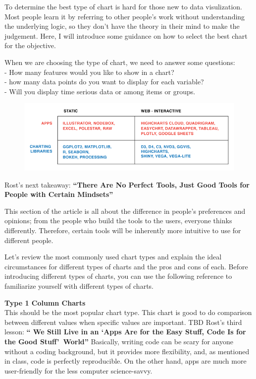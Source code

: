 \documentclass[]{book}
\theoremstyle{definition}
\theoremstyle{definition}
\theoremstyle{definition}
\theoremstyle{remark}
\begin{document}
To determine the best type of chart is hard for those new to data
visulization. Most people learn it by referring to other people's work
without understanding the underlying logic, so they don't have the
theory in their mind to make the judgement. Here, I will introduce some
guidance on how to select the best chart for the objective.

When we are choosing the type of chart, we need to answer some
questions:\\
- How many features would you like to show in a chart?\\
- how many data points do you want to display for each variable?\\
- Will you display time serious data or among items or groups.

\begin{figure}
\centering
\includegraphics{images/interactivity.png}
\caption{}
\end{figure}

Rost's next takeaway: \textbf{``There Are No Perfect Tools, Just Good
Tools for People with Certain Mindsets''}

This section of the article is all about the difference in people's
preferences and opinions; from the people who build the tools to the
users, everyone thinks differently. Therefore, certain tools will be
inherently more intuitive to use for different people.

Let's review the most commonly used chart types and explain the ideal
circumstances for different types of charts and the pros and cons of
each. Before introducing different types of charts, you can use the
following reference to familiarize yourself with different types of
charts. \citep{charts_viz}

\textbf{Type 1 Column Charts}\\
This should be the most popular chart type. This chart is good to do
comparison between different values when specific values are important.
TBD Rost's third lesson: \textbf{`` We Still Live in an `Apps Are for
the Easy Stuff, Code Is for the Good Stuff'~World''} Basically, writing
code can be scary for anyone without a coding background, but it
provides more flexibility, and, as mentioned in class, code is perfectly
reproducible. On the other hand, apps are much more user-friendly for
the less computer science-savvy.
\end{document}
